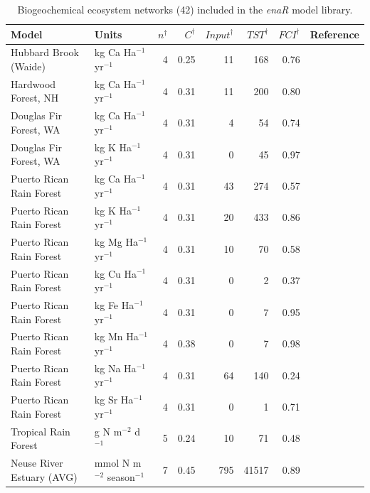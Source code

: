 \documentclass[article]{jss}
\begin{document}
\begin{table}[ht]
\begin{center}
  \caption{Biogeochemical ecosystem networks (42) included in the
    \textit{enaR} model library.} \label{tab:BGC}
  \begin{tiny}
    \begin{tabular}{llrrrrrr}
      \hline
      Model & Units & $n^\dagger$ & $C^\dagger$ & $Input^\dagger$ & $TST^\dagger$ & $FCI^\dagger$ & Reference \\
      \hline
      Hubbard Brook (Waide) & kg Ca Ha$^{-1}$  yr$^{-1}$ &   4 & 0.25 &  11 & 168 & 0.76 & \citet{waide74} \\
      Hardwood Forest, NH & kg Ca Ha$^{-1}$  yr$^{-1}$ &   4 & 0.31 &  11 & 200 & 0.80 & \citet{jordan72} \\
      Douglas Fir Forest, WA  & kg Ca Ha$^{-1}$  yr$^{-1}$ &   4 & 0.31 &   4 &  54 & 0.74 & \citet{jordan72} \\
      Douglas Fir Forest, WA  & kg K Ha$^{-1}$  yr$^{-1}$ &   4 & 0.31 &   0 &  45 & 0.97 & \citet{jordan72} \\
      Puerto Rican Rain Forest & kg Ca Ha$^{-1}$  yr$^{-1}$ &   4 & 0.31 &  43 & 274 & 0.57 & \citet{jordan72} \\
      Puerto Rican Rain Forest & kg K Ha$^{-1}$  yr$^{-1}$ &   4 & 0.31 &  20 & 433 & 0.86 & \citet{jordan72} \\
      Puerto Rican Rain Forest & kg Mg Ha$^{-1}$  yr$^{-1}$ &   4 & 0.31 &  10 &  70 & 0.58 & \citet{jordan72} \\
      Puerto Rican Rain Forest & kg Cu Ha$^{-1}$  yr$^{-1}$ &   4 & 0.31 &   0 &   2 & 0.37 & \citet{jordan72} \\
      Puerto Rican Rain Forest & kg Fe Ha$^{-1}$  yr$^{-1}$ &   4 & 0.31 &   0 &   7 & 0.95 & \citet{jordan72} \\
      Puerto Rican Rain Forest & kg Mn Ha$^{-1}$  yr$^{-1}$ &   4 & 0.38 &   0 &   7 & 0.98 & \citet{jordan72} \\
      Puerto Rican Rain Forest & kg Na Ha$^{-1}$  yr$^{-1}$ &   4 & 0.31 &  64 & 140 & 0.24 & \citet{jordan72} \\
      Puerto Rican Rain Forest & kg Sr Ha$^{-1}$  yr$^{-1}$ &   4 & 0.31 &   0 &   1 & 0.71 & \citet{jordan72} \\
      Tropical Rain Forest & g N m$^{-2}$ d$^{-1}$  &   5 & 0.24 &  10 &  71 & 0.48 & \citet{edmisten70} \\
      Neuse River Estuary (AVG) & mmol N m$^{-2}$ season$^{-1}$ &   7 & 0.45 & 795 & 41517 & 0.89 & \citet{christian03} \\

\end{tabular}
\end{tiny}
\end{center}
\end{table}
\end{document}
